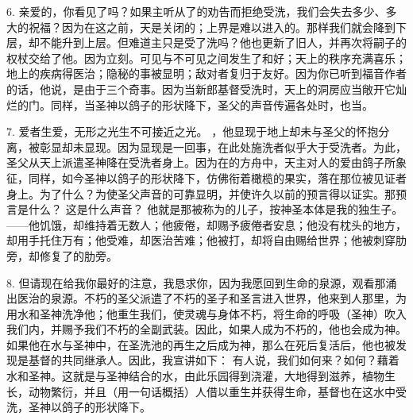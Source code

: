 6. 亲爱的，你看见了吗？如果主听从了的劝告而拒绝受洗，我们会失去多少、多大的祝福？因为在这之前，天是关闭的；上界是难以进入的。那样我们就会降到下层，却不能升到上层。但难道主只是受了洗吗？他也更新了旧人，并再次将嗣子的权杖交给了他。因为立刻。可见与不可见之间发生了和好；天上的秩序充满喜乐；地上的疾病得医治；隐秘的事被显明；敌对者复归于友好。因为你已听到福音作者的话，他说，是由于三个奇事。因为当新郎基督受洗时，天上的洞房应当敞开它灿烂的门。同样，当圣神以鸽子的形状降下，圣父的声音传遍各处时，也当。\par

7. 爱者生爱，无形之光生不可接近之光。 ，他显现于地上却未与圣父的怀抱分离，被彰显却未显现。因为显现是一回事，在此处施洗者似乎大于受洗者。为此，圣父从天上派遣圣神降在受洗者身上。因为在的方舟中，天主对人的爱由鸽子所象征，同样，如今圣神以鸽子的形状降下，仿佛衔着橄榄的果实，落在那位被见证者身上。为了什么？为使圣父声音的可靠显明，并使许久以前的预言得以证实。那预言是什么？ 这是什么声音？ 他就是那被称为的儿子，按神圣本体是我的独生子。 ——他饥饿，却维持着无数人；他疲倦，却赐予疲倦者安息；他没有枕头的地方，却用手托住万有；他受难，却医治苦难；他被打，却将自由赐给世界；他被刺穿肋旁，却修复了的肋旁。\par

8. 但请现在给我你最好的注意，我恳求你，因为我愿回到生命的泉源，观看那涌出医治的泉源。不朽的圣父派遣了不朽的圣子和圣言进入世界，他来到人那里，为用水和圣神洗净他；他重生我们，使灵魂与身体不朽，将生命的呼吸（圣神）吹入我们内，并赐予我们不朽的全副武装。因此，如果人成为不朽的，他也会成为神。如果他在水与圣神中，在圣洗池的再生之后成为神，那么在死后复活后，他也被发现是基督的共同继承人。因此，我宣讲如下： 有人说，我们如何来？如何？藉着水和圣神。这就是与圣神结合的水，由此乐园得到浇灌，大地得到滋养，植物生长，动物繁衍，并且（用一句话概括）人借以重生并获得生命，基督也在这水中受洗，圣神以鸽子的形状降下。\par

